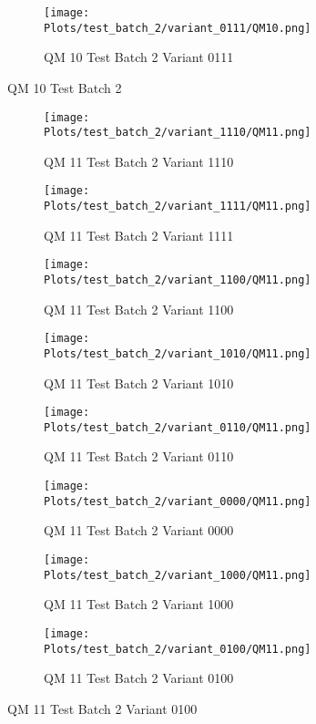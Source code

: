 \documentclass{DissertateFigs}
\begin{document}
\begin{figure}[t!]
\medskip

    \begin{subfigure}{0.47\textwidth}
    \texttt{[image: Plots/test\_batch\_2/variant\_0111/QM10.png]}
    \caption{QM 10 Test Batch 2 Variant 0111}
    \end{subfigure}
\caption{QM 10 Test Batch 2}
    \end{figure}
\clearpage
\begin{figure}[t!]
    \begin{subfigure}{0.47\textwidth}
    \texttt{[image: Plots/test\_batch\_2/variant\_1110/QM11.png]}
    \caption{QM 11 Test Batch 2 Variant 1110}
    \end{subfigure}
    \begin{subfigure}{0.47\textwidth}
    \texttt{[image: Plots/test\_batch\_2/variant\_1111/QM11.png]}
    \caption{QM 11 Test Batch 2 Variant 1111}
    \end{subfigure}

\medskip

    \begin{subfigure}{0.47\textwidth}
    \texttt{[image: Plots/test\_batch\_2/variant\_1100/QM11.png]}
    \caption{QM 11 Test Batch 2 Variant 1100}
    \end{subfigure}
    \begin{subfigure}{0.47\textwidth}
    \texttt{[image: Plots/test\_batch\_2/variant\_1010/QM11.png]}
    \caption{QM 11 Test Batch 2 Variant 1010}
    \end{subfigure}

\medskip

    \begin{subfigure}{0.47\textwidth}
    \texttt{[image: Plots/test\_batch\_2/variant\_0110/QM11.png]}
    \caption{QM 11 Test Batch 2 Variant 0110}
    \end{subfigure}
    \begin{subfigure}{0.47\textwidth}
    \texttt{[image: Plots/test\_batch\_2/variant\_0000/QM11.png]}
    \caption{QM 11 Test Batch 2 Variant 0000}
    \end{subfigure}

\medskip

    \begin{subfigure}{0.47\textwidth}
    \texttt{[image: Plots/test\_batch\_2/variant\_1000/QM11.png]}
    \caption{QM 11 Test Batch 2 Variant 1000}
    \end{subfigure}
    \begin{subfigure}{0.47\textwidth}
    \texttt{[image: Plots/test\_batch\_2/variant\_0100/QM11.png]}
    \caption{QM 11 Test Batch 2 Variant 0100}
    \end{subfigure}


\end{figure}
\end{document}
